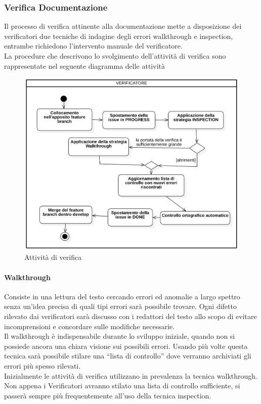         \subsubsection{Verifica Documentazione}
            Il processo di verifica attinente alla documentazione mette a disposizione dei verificatori due tecniche di indagine degli errori walkthrough e inspection, entrambe richiedono l’intervento manuale del verificatore. \\
            La procedure che descrivono lo svolgimento dell’attività di verifica sono rappresentate nel seguente diagramma delle attività \\
            \begin{figure}[H]
                    \centering
                    \includegraphics[width=1.0\textwidth]{res/images/attivita_di_verifica.png}
                \caption{Attività di verifica}
                \label{Attività di verifica}
            \end{figure}
            \paragraph{Walkthrough}
                Consiste in una lettura del testo cercando errori ed anomalie a largo spettro senza un’idea precisa di quali tipi errori sarà possibile trovare. Ogni difetto rilevato dai verificatori sarà discusso con i redattori del testo allo scopo di evitare incomprensioni e concordare sulle modifiche necessarie.\\
                Il walkthrough è indispensabile durante lo sviluppo iniziale, quando non si possiede ancora una chiara visione sui possibili errori. Usando più volte questa tecnica sarà possibile stilare una “lista di controllo” dove verranno archiviati gli errori più spesso rilevati. \\
                Inizialmente le attività di verifica utilizzano in prevalenza la tecnica walkthrough. Non appena i Verificatori avranno stilato una lista di controllo sufficiente, si passerà sempre più frequentemente all’uso della tecnica inspection.\\
